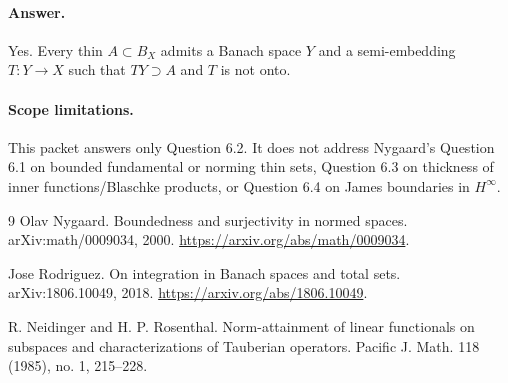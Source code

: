 \documentclass[11pt]{article}
\begin{document}
\paragraph{Answer.}
Yes. Every thin \(A\subset B_X\) admits a Banach space \(Y\) and a
semi-embedding \(T:Y\to X\) such that \(TY\supset A\) and \(T\) is not onto.

\paragraph{Scope limitations.}
This packet answers only Question 6.2. It does not address Nygaard's Question
6.1 on bounded fundamental or norming thin sets, Question 6.3 on thickness of
inner functions/Blaschke products, or Question 6.4 on James boundaries in
\(H^\infty\).

\begin{thebibliography}{9}
Olav Nygaard.
\newblock Boundedness and surjectivity in normed spaces.
\newblock arXiv:math/0009034, 2000.
\newblock \url{https://arxiv.org/abs/math/0009034}.

Jose Rodriguez.
\newblock On integration in Banach spaces and total sets.
\newblock arXiv:1806.10049, 2018.
\newblock \url{https://arxiv.org/abs/1806.10049}.

R. Neidinger and H. P. Rosenthal.
\newblock Norm-attainment of linear functionals on subspaces and
characterizations of Tauberian operators.
\newblock Pacific J. Math. 118 (1985), no. 1, 215--228.
\end{thebibliography}
\end{document}
